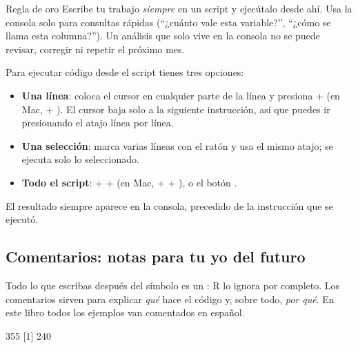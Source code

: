 \begin{concepto}{Regla de oro}
Escribe tu trabajo \emph{siempre} en un script y ejecútalo desde ahí. Usa la
consola solo para consultas rápidas (``¿cuánto vale esta variable?'',
``¿cómo se llama esta columna?''). Un análisis que solo vive en la consola
no se puede revisar, corregir ni repetir el próximo mes.
\end{concepto}

Para ejecutar código desde el script tienes tres opciones:

\begin{itemize}
  \item \textbf{Una línea}: coloca el cursor en cualquier parte de la línea y
        presiona  +  (en Mac,  +
        ). El cursor baja solo a la siguiente instrucción, así
        que puedes ir presionando el atajo línea por línea.
  \item \textbf{Una selección}: marca varias líneas con el ratón y usa el
        mismo atajo; se ejecuta solo lo seleccionado.
  \item \textbf{Todo el script}:  +  + 
        (en Mac,  +  + ), o el botón
        .
\end{itemize}

El resultado siempre aparece en la consola, precedido de la instrucción que
se ejecutó.

\subsection{Comentarios: notas para tu yo del futuro}

Todo lo que escribas después del símbolo \codigo{\#} es un
: R lo ignora por completo. Los comentarios sirven para
explicar \emph{qué} hace el código y, sobre todo, \emph{por qué}. En este
libro todos los ejemplos van comentados en español.

\begin{rsalida}
[1] 355
[1] 240
\end{rsalida}


